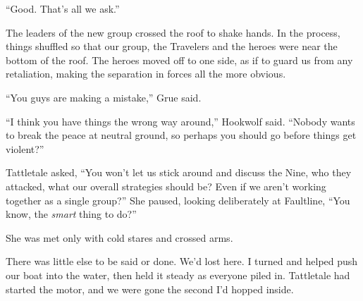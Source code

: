 ``Good.  That's all we ask.''



The leaders of the new group crossed the roof to shake hands.  In the process, things shuffled so that our group, the Travelers and the heroes were near the bottom of the roof.  The heroes moved off to one side, as if to guard us from any retaliation, making the separation in forces all the more obvious.



``You guys are making a mistake,'' Grue said.



``I think you have things the wrong way around,'' Hookwolf said.  ``Nobody wants to break the peace at neutral ground, so perhaps you should go before things get violent?''



Tattletale asked, ``You won't let us stick around and discuss the Nine, who they attacked, what our overall strategies should be?  Even if we aren't working together as a single group?''  She paused, looking deliberately at Faultline, ``You know, the \emph{smart} thing to do?''



She was met only with cold stares and crossed arms.



There was little else to be said or done.  We'd lost here.  I turned and helped push our boat into the water, then held it steady as everyone piled in.  Tattletale had started the motor, and we were gone the second I'd hopped inside.





